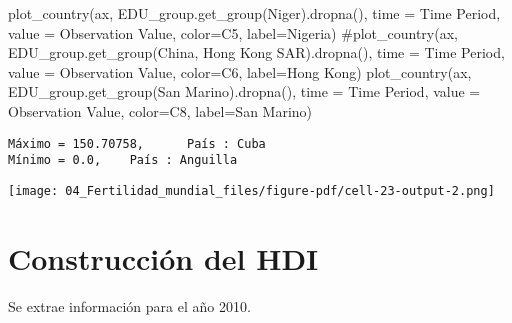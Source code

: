\documentclass[
  letterpaper,
  DIV=11,
  numbers=noendperiod]{scrreprt}
\newenvironment{Shaded}{\begin{snugshade}}{\end{snugshade}}
\newcommand{\CommentTok}[1]{\textcolor[rgb]{0.37,0.37,0.37}{#1}}
\newcommand{\NormalTok}[1]{\textcolor[rgb]{0.00,0.23,0.31}{#1}}
\newcommand{\OperatorTok}[1]{\textcolor[rgb]{0.37,0.37,0.37}{#1}}
\newcommand{\StringTok}[1]{\textcolor[rgb]{0.13,0.47,0.30}{#1}}
\begin{document}
\begin{Shaded}
\begin{Highlighting}[]
\NormalTok{plot\_country(ax, EDU\_group.get\_group(}\StringTok{\textquotesingle{}Niger\textquotesingle{}}\NormalTok{).dropna(), time }\OperatorTok{=} \StringTok{\textquotesingle{}Time Period\textquotesingle{}}\NormalTok{, value }\OperatorTok{=} \StringTok{\textquotesingle{}Observation Value\textquotesingle{}}\NormalTok{, color}\OperatorTok{=}\StringTok{\textquotesingle{}C5\textquotesingle{}}\NormalTok{, label}\OperatorTok{=}\StringTok{\textquotesingle{}Nigeria\textquotesingle{}}\NormalTok{)}
\CommentTok{\#plot\_country(ax, EDU\_group.get\_group(\textquotesingle{}China, Hong Kong SAR\textquotesingle{}).dropna(), time = \textquotesingle{}Time Period\textquotesingle{}, value = \textquotesingle{}Observation Value\textquotesingle{}, color=\textquotesingle{}C6\textquotesingle{}, label=\textquotesingle{}Hong Kong\textquotesingle{})}
\NormalTok{plot\_country(ax, EDU\_group.get\_group(}\StringTok{\textquotesingle{}San Marino\textquotesingle{}}\NormalTok{).dropna(), time }\OperatorTok{=} \StringTok{\textquotesingle{}Time Period\textquotesingle{}}\NormalTok{, value }\OperatorTok{=} \StringTok{\textquotesingle{}Observation Value\textquotesingle{}}\NormalTok{, color}\OperatorTok{=}\StringTok{\textquotesingle{}C8\textquotesingle{}}\NormalTok{, label}\OperatorTok{=}\StringTok{\textquotesingle{}San Marino\textquotesingle{}}\NormalTok{)}
\end{Highlighting}
\end{Shaded}

\begin{verbatim}
Máximo = 150.70758,      País : Cuba
Mínimo = 0.0,    País : Anguilla
\end{verbatim}

\texttt{[image: 04\_Fertilidad\_mundial\_files/figure-pdf/cell-23-output-2.png]}

\section{Construcción del HDI}\label{construcciuxf3n-del-hdi}

Se extrae información para el año 2010.
\end{document}

